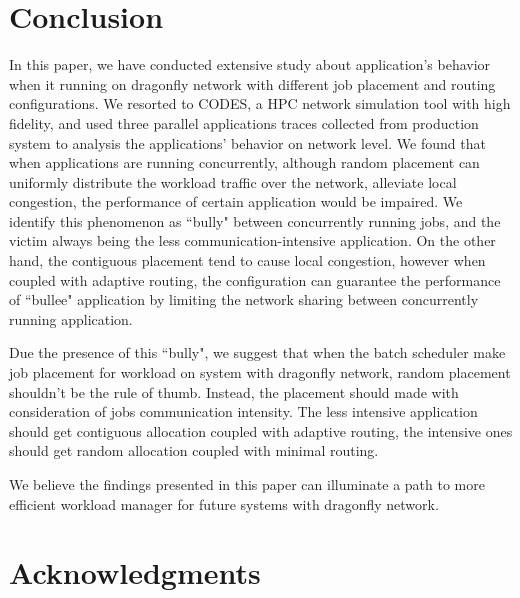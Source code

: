 \documentclass[conference,compsoc]{IEEEtran}
\begin{document}
\section{Conclusion}
\label{sec:conclusion}

In this paper, we have conducted extensive study about application's behavior when it running on dragonfly network with different job placement and routing configurations. We resorted to CODES, a HPC network simulation tool with high fidelity, and used three parallel applications traces collected from production system to analysis the applications' behavior on network level. We found that when applications are running concurrently, although random placement can uniformly distribute the workload traffic over the network, alleviate local congestion, the performance of certain application would be impaired. We identify this phenomenon as ``bully" between concurrently running jobs, and the victim always being the less communication-intensive application. On the other hand, the contiguous placement tend to cause local congestion, however when coupled with adaptive routing, the configuration can guarantee the performance of ``bullee" application by limiting the network sharing between concurrently running application. 

Due the presence of this ``bully", we suggest that when the batch scheduler make job placement for workload on system with dragonfly network, random placement shouldn't be the rule of thumb. Instead, the placement should made with consideration of jobs communication intensity. The less intensive application should get contiguous allocation coupled with adaptive routing, the intensive ones should get random allocation coupled with minimal routing. 

We believe the findings presented in this paper can illuminate a path to more efficient workload manager for future systems with dragonfly network.






\ifCLASSOPTIONcompsoc
  \section*{Acknowledgments}
\else
\fi
\end{document}
